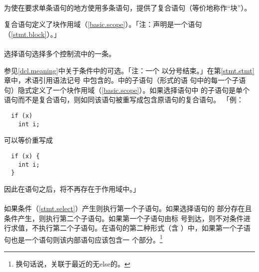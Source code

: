 \paragraph{}
为使在要求单条语句的地方使用多条语句，提供了复合语句（等价地称作``块''）。


复合语句定义了块作用域（\ref{basic.scope}）。「注：声明是一个语句
（\ref{stmt.block}）。」

\paragraph{}
选择语句选择多个控制流中的一条。


参见\ref{dcl.meaning}中关于条件中的可选。「注：一个
以分号结束。」在第\ref{stmt.stmt}章中，术语引用语法记号
中包含的。中的子语句（形式的语
句中的每一个子语句）隐式定义了一个块作用域（\ref{basic.scope}）。如果选择语句中
的子语句是单个语句而不是复合语句，则如同该语句被重写成包含原语句的复合语句。
「例：
\begin{lstlisting}
  if (x)
    int i;
\end{lstlisting}
可以等价重写成
\begin{lstlisting}
  if (x) {
    int i;
  }
\end{lstlisting}
因此在语句之后，将不再存在于作用域中。」

\paragraph{}
如果条件（\ref{stmt.select}）产生则执行第一个子语句。如果选择语句的
部分存在且条件产生，则执行第二个子语句。如果第一个子语句由标
号到达，则不对条件进行求值，不执行第二个子语句。在语句的第二种形式（含
）中，如果第一个子语句也是一个语句则该内部语句应该包含一
个部分。\footnote{换句话说，关联于最近的无else的。}

